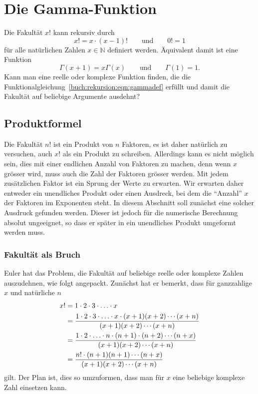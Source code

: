 %
%
%
\section{Die Gamma-Funktion
\label{buch:rekursion:section:gamma}}
Die Fakultät $x!$ kann rekursiv durch 
\[
	x! = x\cdot (x-1)! \qquad\text{und}\qquad 0!=1
\]
für alle natürlichen Zahlen $x\in\mathbb{N}$ definiert werden.
Äquivalent damit ist eine Funktion 
\begin{equation}
\Gamma(x+1) = x\Gamma(x)
\qquad\text{und}\qquad 
\Gamma(1)=1.
\label{buch:rekursion:eqn:gammadef}
\end{equation}
Kann man eine reelle oder komplexe Funktion finden, die die
Funktionalgleichung~\eqref{buch:rekursion:eqn:gammadef}
erfüllt und damit die Fakultät auf beliebige Argumente ausdehnt?

\subsection{Produktformel}
Die Fakultät $n!$ ist ein Produkt von $n$ Faktoren, es ist daher
natürlich zu versuchen, auch $x!$ als ein Produkt zu schreiben.
Allerdings kann es nicht möglich sein, dies mit einer endlichen
Anzahl von Faktoren zu machen, denn wenn $x$ grösser wird, muss auch
die Zahl der Faktoren grösser werden.
Mit jedem zusätzlichen Faktor ist ein Sprung der Werte zu erwarten.
Wir erwarten daher entweder ein unendliches Produkt oder einen
Ausdreck, bei dem die ``Anzahl'' $x$ der Faktoren im Exponenten
steht.
In diesem Abschnitt soll zunächst eine solcher Ausdruck gefunden
werden.
Dieser ist jedoch für die numerische Berechnung absolut ungeeignet,
so dass er später in ein unendliches Produkt umgeformt werden muss.

\subsubsection{Fakultät als Bruch}
Euler hat das Problem, die Fakultät auf beliebige reelle oder komplexe
Zahlen auszudehnen, wie folgt angepackt.
Zunächst hat er bemerkt, dass für ganzzahlige $x$ und natürliche $n$
\begin{align}
x! 
&=
1\cdot 2\cdot 3\cdot\ldots\cdot x
\notag
\\
&=
\frac{
1\cdot 2\cdot 3\cdot\ldots\cdot x\cdot (x+1) (x+2)\cdots(x+n)
}{
(x+1)(x+2)\cdots(x+n)
}
\notag
\\
&=
\frac{
1\cdot 2\cdot\ldots\cdot n\cdot(n+1)\cdot(n+2)\cdots(n+x)
}{
(x+1)(x+2)\cdots(x+n)
}
\notag
\\
&=
\frac{n! \cdot (n+1)(n+1)\cdots(n+x)}{(x+1)(x+2)\cdots(x+n)}
\label{buch:rekursion:gamma:eqn:fakultaet}
\end{align}
gilt.
Der Plan ist, dies so umzuformen, dass man für $x$ eine beliebige
komplexe Zahl einsetzen kann.

